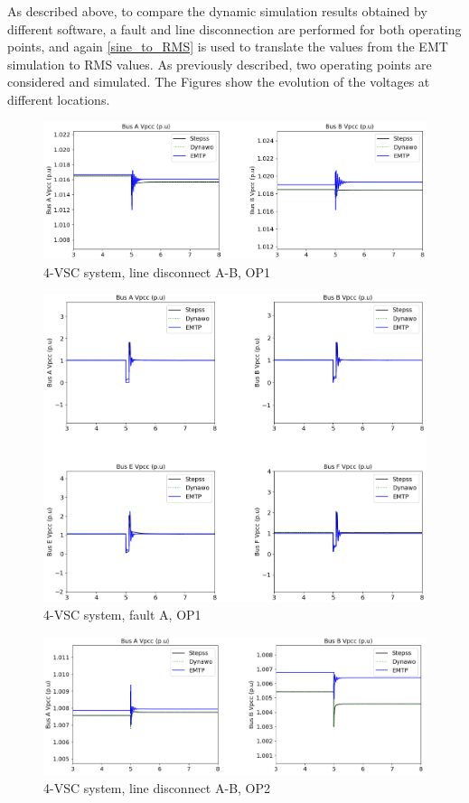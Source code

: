 \documentclass{report}
\begin{document}
As described above, to compare the dynamic simulation results obtained by different software, a fault and line disconnection are performed for both operating points, and again \eqref{sine_to_RMS} is used to translate the values from the EMT simulation to RMS values. As previously described, two operating points are considered and simulated. 
The Figures show the evolution of the voltages at different locations.

\begin{figure}[H]
    \centering
    \includegraphics[width = \columnwidth]{Figure_4VSC/4VSC_OP1_line_disconnect.png}
    \caption{4-VSC system, line disconnect A-B, OP1}
    \label{fig:4VSC_line_disconnect_OP1}
\end{figure}
\begin{figure}[H]
    \centering
    \includegraphics[width = \columnwidth]{Figure_4VSC/4VSC_OP1_fault.png}
    \caption{4-VSC system, fault A, OP1}
    \label{fig:4VSC_fault_OP1}
\end{figure}
\begin{figure}[H]
    \centering
    \includegraphics[width = \columnwidth]{Figure_4VSC/4VSC_OP2_line_disconnect.png}
    \caption{4-VSC system, line disconnect A-B, OP2}
    \label{fig:4VSC_line_disconnect_OP2}
\end{figure}
\end{document}
